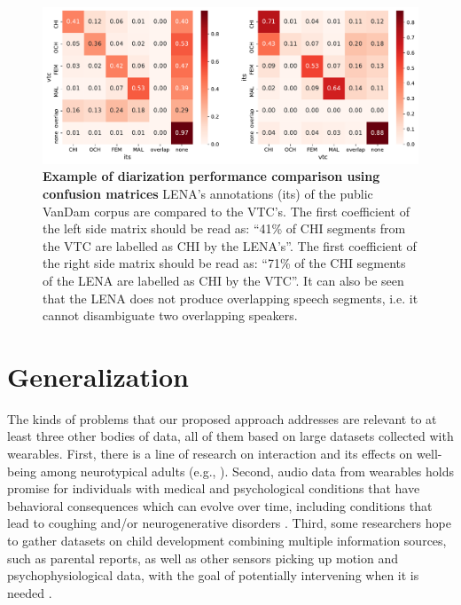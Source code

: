 \documentclass[smallextended]{svjour3}       %
\begin{document}
\begin{figure}[htb]

\centering
\includegraphics[width=\textwidth]{Fig5.pdf}

\caption{\label{fig:confusion}\textbf{Example of diarization performance comparison using confusion matrices}
LENA's annotations (its) of the public VanDam corpus \citep{vandam-day} are compared to the VTC's. The first coefficient of the left side matrix should be read as: ``41\% of CHI segments from the VTC are labelled as CHI by the LENA's''. The first coefficient of the right side matrix should be read as: ``71\% of the CHI segments of the LENA are labelled as CHI by the VTC''. It can also be seen that the LENA does not produce overlapping speech segments, i.e. it cannot disambiguate two overlapping speakers.
}

\end{figure}




\section{Generalization}

The kinds of problems that our proposed approach addresses are relevant to at least three other bodies of data, all of them based on large datasets collected with wearables. First, there is a line of research on interaction and its effects on well-being among neurotypical adults (e.g., \cite{ear1}). Second, audio data from wearables holds promise for individuals with medical and psychological conditions that have behavioral consequences which can evolve over time, including conditions that lead to coughing \citep{Wu2018} and/or neurogenerative disorders \citep{riad2020vocal}. Third, some researchers hope to gather datasets on child development combining multiple information sources, such as parental reports, as well as other sensors picking up motion and psychophysiological data, with the goal of potentially intervening when it is needed \citep{levin2021sensing}.
\end{document}
